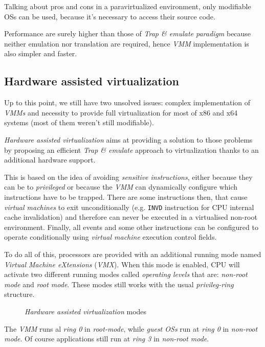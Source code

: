 \bigskip\noindent
Talking about pros and cons in a paravirtualized environment, only modifiable
OSs can be used, because it's necessary to access their source code.

Performance are surely higher than those of \emph{Trap \& emulate paradigm}
because neither emulation nor translation are required, hence \emph{VMM}
implementation is also simpler and faster.

\subsection{Hardware assisted virtualization}
Up to this point, we still have two unsolved issues: complex implementation of
\emph{VMMs} and necessity to provide full virtualization for most of x86 and x64
systems (most of them weren't still modifiable).

\emph{Hardware assisted virtualization} aims at providing a solution to those
problems by proposing an efficient \emph{Trap \& emulate} approach to
virtualization thanks to an additional hardware support.

This is based on the idea of avoiding \emph{sensitive instructions}, either
because they can be  to \emph{privileged} or because the \emph{VMM}
can dynamically configure which instructions have to be trapped. There are some
instructions then, that cause \emph{virtual machines} to exit unconditionally
(e.g. \texttt{INVD} instruction for CPU internal cache invalidation) and therefore
can never be executed in a virtualised non-root environment. Finally, all
events and some other instructions can be configured to operate conditionally
using \emph{virtual machine} execution control fields.

To do all of this, processors are provided with an additional running mode
named \emph{Virtual Machine eXtensions} (\emph{VMX}). When this mode is enabled,
CPU will activate two different running modes called \emph{operating levels}
that are: \emph{non-root mode} and \emph{root mode}. These modes still works
with the usual \emph{privileg-ring} structure.

\begin{figure}[h!]
    \centering
    \caption{\emph{Hardware assisted virtualization} modes}
\end{figure}\noindent
The \emph{VMM} runs al \emph{ring 0} in \emph{root-mode}, while \emph{guest OSs}
run at \emph{ring 0} in \emph{non-root mode}. Of course applications still run
at \emph{ring 3} in \emph{non-root mode}.

